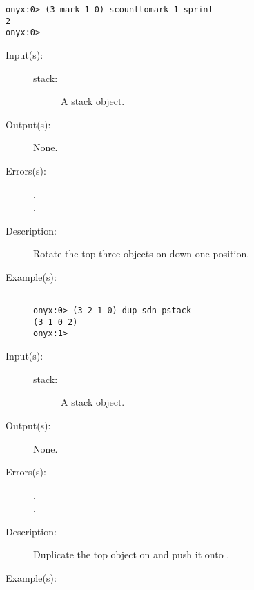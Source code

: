 \begin{description}
\begin{description}
\begin{verbatim}
onyx:0> (3 mark 1 0) scounttomark 1 sprint
2
onyx:0>
		\end{verbatim}
	\end{description}
\label{systemdict:sdn}
\item[{\onyxop{stack}{sdn}{--}}: ]
	\begin{description}\item[]
	\item[Input(s): ]
		\begin{description}\item[]
		\item[stack: ]
			A stack object.
		\end{description}
	\item[Output(s): ] None.
	\item[Errors(s): ]
		\begin{description}\item[]
		\item[.]
		\item[.]
		\end{description}
	\item[Description: ]
		Rotate the top three objects on  down one position.
	\item[Example(s): ]\begin{verbatim}

onyx:0> (3 2 1 0) dup sdn pstack
(3 1 0 2)
onyx:1>
		\end{verbatim}
	\end{description}
\label{systemdict:sdup}
\item[{\onyxop{stack}{sdup}{--}}: ]
	\begin{description}\item[]
	\item[Input(s): ]
		\begin{description}\item[]
		\item[stack: ]
			A stack object.
		\end{description}
	\item[Output(s): ] None.
	\item[Errors(s): ]
		\begin{description}\item[]
		\item[.]
		\item[.]
		\end{description}
	\item[Description: ]
		Duplicate the top object on  and push it onto
		.
	\item[Example(s): ]\begin{verbatim}


\end{verbatim}
\end{description}
\end{description}
